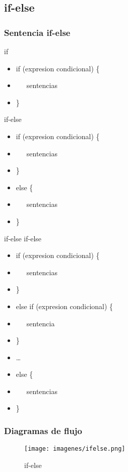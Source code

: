 \documentclass{beamer}
\begin{document}
\subsection{if-else}
\begin{frame}
    \frametitle{Sentencia if-else}
\begin{multicols}{2}
\begin{footnotesize}
\alert{if}
\begin{itemize}[<+-| alert@+>]
\item if (expresion condicional) \{
\item \ \ \ sentencias
\item \}
\end{itemize}
\pause
\alert{if-else}
\begin{itemize}[<+-| alert@+>]
\item if (expresion condicional) \{
\item \ \ \ sentencias
\item \}
\item else \{
\item \ \ \ sentencias
\item \}\
\end{itemize}
\pause
\alert{if-else if-else}
\begin{itemize}[<+-| alert@+>]
\item if (expresion condicional) \{
\item \ \ \ sentencias
\item \}
\item else if (expresion condicional) \{
\item \ \ \ sentencia
\item \}\
\item \dots
\item else \{
\item \ \ \ sentencias
\item \}\
\end{itemize}
\end{footnotesize}
\end{multicols}
\pause
\end{frame}

\begin{frame}
\frametitle{Diagramas de flujo}
\begin{figure}
\texttt{[image: imagenes/ifelse.png]}
\caption{if-else}
\end{figure}

\end{frame}
\end{document}
